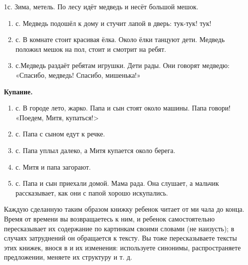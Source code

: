 \documentclass[a5paper]{book}
\begin{document}
1с. Зима, метель. По лесу идёт медведь и несёт большой мешок.


\begin{enumerate}
\def\labelenumi{\arabic{enumi}.}
\setcounter{enumi}{1}
\item
  
  с. Медведь подошёл к дому и стучит лапой в дверь: тук-тук! тук!
  
\item
  
  с. В комнате стоит красивая ёлка. Около ёлки танцуют дети. Медведь
  положил мешок на пол, стоит и смотрит на ребят.
  
\item
  
  с.Медведь раздаёт ребятам игрушки. Дети рады. Они говорят медведю:
  «Спасибо, медведь! Спасибо, мишенька!»
  
\end{enumerate}


\textbf{Купание.}


\begin{enumerate}
\def\labelenumi{\arabic{enumi}.}
\item
  
  с. В городе лето, жарко. Папа и сын стоят около машины. Папа говори!\\
  «Поедем, Митя, купаться!\textgreater{}
  
\item
  
  с. Папа с сыном едут к речке.
  
\item
  
  с. Папа уплыл далеко, а Митя купается около берега.
  
\item
  
  с. Митя и папа загорают.
  
\item
  
  с. Папа и сын приехали домой. Мама рада. Она слушает, а мальчик
  рассказывает, как они с папой хорошо искупались.
  
\end{enumerate}


Каждую сделанную таким образом книжку ребенок читает от ми чала до
конца. Время от времени вы возвращаетесь к ним, и ребенок самостоятельно
пересказывает их содержание по картинкам своими словами (не наизусть); в
случаях затруднений он обращается к тексту. Вы тоже пересказываете
тексты этих книжек, внося в и их изменения: используете синонимы,
распространяете предложении, меняете их структуру и т. д.
\end{document}
